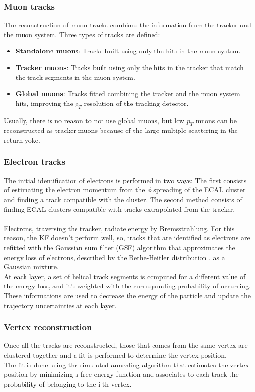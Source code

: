 \subsubsection*{Muon tracks}
The reconstruction of muon tracks combines the information from the tracker and the muon system. Three types of tracks are defined:
\begin{itemize}
    \item \textbf{Standalone muons}: Tracks built using only the hits in the muon system.
    \item \textbf{Tracker muons}: Tracks built using only the hits in the tracker that match the track segments in the muon system.
    \item \textbf{Global muons}: Tracks fitted combining the tracker and the muon system hits, improving the $p_T$ resolution of the tracking detector.
\end{itemize}
Usually, there is no reason to not use global muons, but low $p_T$ muons can be reconstructed as tracker muons because of the large multiple scattering in the return yoke. 

\subsubsection*{Electron tracks}
The initial identification of electrons is performed in two ways:
The first consists of estimating the electron momentum from the $\phi$ spreading of the ECAL cluster and finding a track compatible with the cluster.
The second method consists of finding ECAL clusters compatible with tracks extrapolated  from the tracker.\\
\\
Electrons, traversing the tracker, radiate energy by Bremsstrahlung. For this reason, the KF doesn't perform well, so, tracks that are identified as electrons are refitted with the Gaussian sum filter (GSF) algorithm \cite{Adam2003ReconstructionLHC} that approximates the energy loss of electrons, described by the Bethe-Heitler distribution \cite{Bethe1934OnElectrons}, as a Gaussian mixture.\\
At each layer, a set of helical track segments is computed for a different value of the energy loss, and it's weighted with the corresponding probability of occurring. These informations are used to decrease the energy of the particle and update the trajectory uncertainties at each layer.
\subsubsection*{Vertex reconstruction}
Once all the tracks are reconstructed, those that comes from the same vertex are clustered together and a fit is performed to determine the vertex position.\\
The fit is done using the simulated annealing algorithm \cite{Kirkpatrick1983OptimizationAnnealing} that estimates the vertex position by minimizing a free energy function and associates to each track the probability of belonging to the i-th vertex. \\

